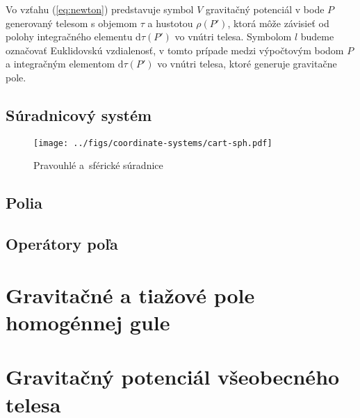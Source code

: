 \documentclass[a4paper, 12pt]{book}
\newcommand{\diff}{\mathrm d}
\begin{document}
Vo vzťahu (\ref{eq:newton}) predstavuje symbol $V$ gravitačný potenciál v bode 
$P$ generovaný telesom s objemom $\tau$ a hustotou $\rho(P')$, ktorá môže 
závisieť od polohy integračného elementu $\diff \tau(P')$ vo vnútri telesa.  
Symbolom $l$ budeme označovať Euklidovskú vzdialenosť, v tomto prípade medzi 
výpočtovým bodom $P$ a integračným elementom $\diff \tau(P')$ vo vnútri telesa, 
ktoré generuje gravitačne pole.







\section{Súradnicový systém}

\begin{figure}[bt]
\centering
\texttt{[image: ../figs/coordinate-systems/cart-sph.pdf]}
\caption{Pravouhlé a~sférické súradnice}
\end{figure}


\section{Polia}

\section{Operátory poľa}








\chapter{Gravitačné a tiažové pole homogénnej gule}







\chapter{Gravitačný potenciál všeobecného telesa}
\end{document}
